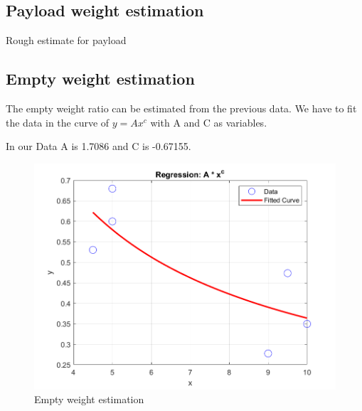 \documentclass[12 pt]{article}
\begin{document}
\subsection{Payload weight estimation}
Rough estimate for payload
\begin{table}[h]
\centering
{}
\end{table}

\hfill


\subsection{Empty weight estimation}
The empty weight ratio can be estimated from the previous data. We have to fit the data in the curve of $y = A x^c$ with A and C as variables.

In our Data A is 1.7086 and C is -0.67155.

\begin{figure}[h]
    \centering
    \includegraphics[width = \linewidth]{Regression.png}
    \caption{Empty weight estimation}
    \label{fig:enter-label}
\end{figure}
\end{document}
